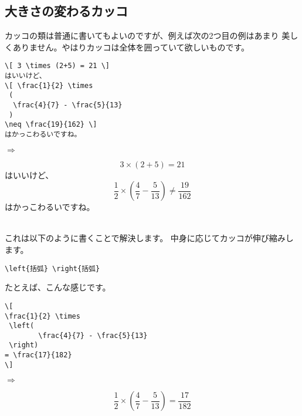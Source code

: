 \subsection{大きさの変わるカッコ}\label{sec:pa}
カッコの類は普通に書いてもよいのですが、例えば次の2つ目の例はあまり
美しくありません。やはりカッコは全体を囲っていて欲しいものです。\\
\begin{minipage}[c]{.50\textwidth}
\begin{screen}
\small
\begin{verbatim}
\[ 3 \times (2+5) = 21 \]
はいいけど、
\[ \frac{1}{2} \times
 (
  \frac{4}{7} - \frac{5}{13}
 )
\neq \frac{19}{162} \]
はかっこわるいですね。
\end{verbatim}
\end{screen}
\end{minipage}%
$\Rightarrow$
\begin{minipage}{.45\textwidth}
\begin{shadebox}
\[ 3 \times (2+5) = 21 \]
はいいけど、
\[ \frac{1}{2} \times
 (
  \frac{4}{7} - \frac{5}{13}
 )
\neq \frac{19}{162} \]
はかっこわるいですね。
\end{shadebox}
\end{minipage}
\vspace*{1mm}\\
これは以下のように書くことで解決します。
中身に応じてカッコが伸び縮みします。
\begin{screen}
\begin{verbatim}
\left{括弧} \right{括弧}
\end{verbatim}
\end{screen}
たとえば、こんな感じです。\\
\begin{minipage}[c]{.50\textwidth}
\begin{screen}
\small
\begin{verbatim}
\[
\frac{1}{2} \times
 \left(
        \frac{4}{7} - \frac{5}{13}
 \right)
= \frac{17}{182}
\]
\end{verbatim}
\end{screen}
\end{minipage}%
$\Rightarrow$
\begin{minipage}{.45\textwidth}
\begin{shadebox}
\[
\frac{1}{2} \times
 \left(
        \frac{4}{7} - \frac{5}{13}
 \right)
= \frac{17}{182}
\]
\end{shadebox}
\end{minipage}
\vspace*{1mm}\\


